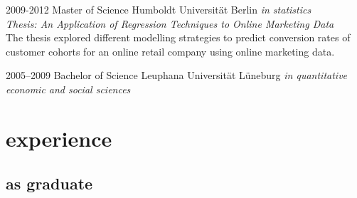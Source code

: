 \documentclass[]{friggeri-cv} %
\begin{document}
\begin{entrylist}


\entry
{2009-2012}
{Master {\normalfont of Science}}
{Humboldt Universit\"at Berlin}
{\emph{in statistics \\ Thesis: An Application of Regression Techniques to Online Marketing Data} \\ The thesis explored different modelling strategies to predict conversion rates of customer cohorts for an online retail company using online marketing data.}


\entry
{2005--2009}
{Bachelor {\normalfont of Science}}
{Leuphana Universit\"at L\"uneburg}
{\emph{in quantitative economic and social sciences}}


\end{entrylist}


\section{experience}

\subsection{as graduate}
\end{document}
